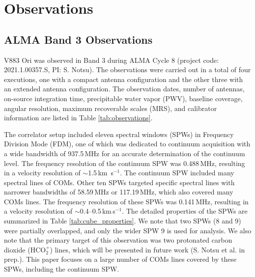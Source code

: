 \documentclass[twocolumn, twocolappendix, astrosymb, times]{aastex631}
\newcommand{\hcotp}{HCO$_2^+$}
\begin{document}
\section{Observations} \label{sec:observation}

\subsection{ALMA Band 3 Observations}
V883 Ori was observed in Band 3 during ALMA Cycle 8 (project code: 2021.1.00357.S, PI: S. Notsu). The observations were carried out in a total of four executions, one with a compact antenna configuration and the other three with an extended antenna configuration. The observation dates, number of antennas, on-source integration time, precipitable water vapor (PWV), baseline coverage, angular resolution, maximum recoverable scales (MRS), and calibrator information are listed in Table \ref{tab:observations}. 

The correlator setup included eleven spectral windows (SPWs) in Frequency Division Mode (FDM), one of which was dedicated to continuum acquisition with a wide bandwidth of 937.5\,MHz for an accurate determination of the continuum level. The frequency resolution of the continuum SPW was 0.488\,MHz, resulting in a velocity resolution of $\sim$1.5\,km \,s$^{-1}$. The continuum SPW included many spectral lines of COMs. Other ten SPWs targeted specific spectral lines with narrower bandwidths of 58.59\,MHz or 117.19\,MHz, which also covered many COMs lines. The frequency resolution of these SPWs was 0.141\,MHz, resulting in a velocity resolution of $\sim$0.4--0.5\,km\,s$^{-1}$. 
The detailed properties of the SPWs are summarized in Table \ref{tab:cube_properties}. We note that two SPWs (8 and 9) were partially overlapped, and only the wider SPW 9 is used for analysis. We also note that the primary target of this observation was two protonated carbon dioxide (\hcotp) lines, which will be presented in future work (S. Notsu et al. in prep.). This paper focuses on a large number of COMs lines covered by these SPWs, including the continuum SPW.
\end{document}
